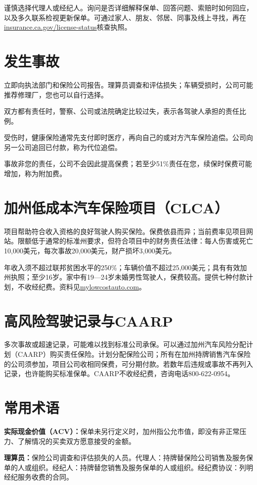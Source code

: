 \documentclass[UTF8,fontset=none,11pt,a4paper]{ctexart}
\begin{document}
谨慎选择代理人或经纪人。询问是否详细解释保单、回答问题、索赔时如何回应，以及多久联系检视更新保单。可通过家人、朋友、邻居、同事及线上寻找，再在\url{insurance.ca.gov/license-status}\allowbreak\mbox{核查执照。}


\section*{发生事故}
立即向执法部门和保险公司报告。理算员调查和评估损失；车辆受损时，公司可能推荐修理厂，您也可以\allowbreak\mbox{自行选择。}


双方都有责任时，警察、公司或法院确定比较过失，表示各驾驶人承担的\allowbreak\mbox{责任比例。}


受伤时，健康保险通常先支付即时医疗，再向自己的或对方汽车保险追偿。公司向另一公司追回已付款，称为\allowbreak\mbox{代位追偿。}


事故非您的责任，公司不会因此提高保费；若至少51\%责任在您，续保时保费可能增加，称\allowbreak\mbox{为附加费。}


\section*{加州低成本汽车保险项目（CLCA）}
项目帮助符合收入资格的良好驾驶人购买保险。保费依县而异；当前费率见项目网站。限额低于通常的标准州要求，但符合项目中的财务责任法律：每人伤害或死亡10,000美元，每次事故20,000美元，财产损坏3,000美元。


年收入须不超过联邦贫困水平的250\%；车辆价值不超过25,000美元；具有有效加州执照；至少16岁。家中有19—24岁未婚男性驾驶人，保费较高。提供七种付款计划，不收经纪费。资料见\url{mylowcostauto.com}。


\section*{高风险驾驶记录与CAARP}
多次事故或超速记录，可能难以找到标准公司承保。可以通过加州汽车风险分配计划（CAARP）购买责任保险。计划分配保险公司；所有在加州持牌销售汽车保险的公司须参加，项目公司收相同保费，可分期付款。若数年后违规或事故不再列入记录，也许能购买标准保单。CAARP不收经纪费，咨询电话800-622-0954。


\section*{常用术语}
\textbf{实际现金价值（ACV）：}保单未另行定义时，加州指公允市值，即没有非正常压力、了解情况的买卖双方愿意接\allowbreak\mbox{受的金额。}


\textbf{理算员：}保险公司调查和评估损失的人员。代理人：持牌替保险公司销售及服务保单的人或组织。经纪人：持牌替您销售及服务保单的人或组织。经纪费协议：列明经纪服务收\allowbreak\mbox{费的合同。}
\end{document}
